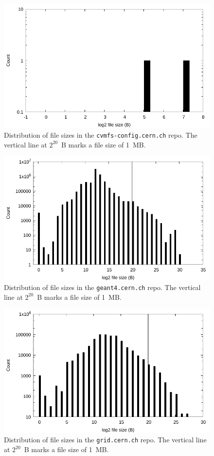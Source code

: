 \documentclass[sigconf]{acmart}
\begin{document}
\begin{figure}
\includegraphics[width=\linewidth]{plots/file-hist/cvmfs-config.pdf}
\caption{Distribution of file sizes in the \texttt{cvmfs-config.cern.ch} repo.
The vertical line at $2^{20}$~B marks a file size of 1~MB.}
\end{figure}

\begin{figure}
\includegraphics[width=\linewidth]{plots/file-hist/geant4.pdf}
\caption{Distribution of file sizes in the \texttt{geant4.cern.ch} repo.
The vertical line at $2^{20}$~B marks a file size of 1~MB.}
\end{figure}

\begin{figure}
\includegraphics[width=\linewidth]{plots/file-hist/grid.pdf}
\caption{Distribution of file sizes in the \texttt{grid.cern.ch} repo.
The vertical line at $2^{20}$~B marks a file size of 1~MB.}
\end{figure}
\end{document}
